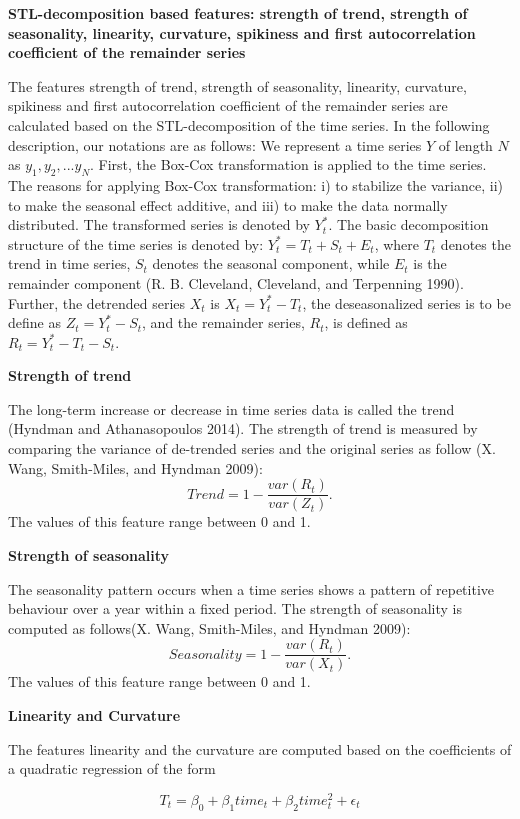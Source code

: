 \documentclass[11pt,]{article}
\theoremstyle{definition}
\theoremstyle{definition}
\theoremstyle{definition}
\theoremstyle{remark}
\begin{document}
\textbf{STL-decomposition based features: strength of trend, strength of
seasonality, linearity, curvature, spikiness and first autocorrelation
coefficient of the remainder series}

The features strength of trend, strength of seasonality, linearity,
curvature, spikiness and first autocorrelation coefficient of the
remainder series are calculated based on the STL-decomposition of the
time series. In the following description, our notations are as follows:
We represent a time series \(Y\) of length \(N\) as
\(y_1, y_2, ...y_N\). First, the Box-Cox transformation is applied to
the time series. The reasons for applying Box-Cox transformation: i) to
stabilize the variance, ii) to make the seasonal effect additive, and
iii) to make the data normally distributed. The transformed series is
denoted by \(Y_{t}^*\). The basic decomposition structure of the time
series is denoted by: \(Y_t^*=T_t+S_t+E_t\), where \(T_t\) denotes the
trend in time series, \(S_t\) denotes the seasonal component, while
\(E_t\) is the remainder component (R. B. Cleveland, Cleveland, and
Terpenning 1990). Further, the detrended series \(X_t\) is
\(X_t=Y_t^*-T_t\), the deseasonalized series is to be define as
\(Z_t=Y_t^*-S_t\), and the remainder series, \(R_t\), is defined as
\(R_t=Y_t^*-T_t-S_t\).

\textbf{Strength of trend}

The long-term increase or decrease in time series data is called the
trend (Hyndman and Athanasopoulos 2014). The strength of trend is
measured by comparing the variance of de-trended series and the original
series as follow (X. Wang, Smith-Miles, and Hyndman 2009): \[
    Trend =1- \frac{var(R_{t})}{var(Z_{t})}.
\] The values of this feature range between 0 and 1.

\textbf{Strength of seasonality}

The seasonality pattern occurs when a time series shows a pattern of
repetitive behaviour over a year within a fixed period. The strength of
seasonality is computed as follows(X. Wang, Smith-Miles, and Hyndman
2009): \[
    Seasonality =1- \frac{var(R_{t})}{var(X_{t})}.
\]The values of this feature range between 0 and 1.

\textbf{Linearity and Curvature}

The features linearity and the curvature are computed based on the
coefficients of a quadratic regression of the form

\[T_t=\beta_0+\beta_1time_t+\beta_2time_t^2+\epsilon_t\]
\end{document}
